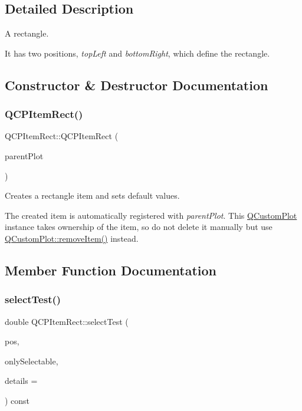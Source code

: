 \subsection{Detailed Description}
A rectangle. 

 It has two positions, {\itshape top\+Left} and {\itshape bottom\+Right}, which define the rectangle. 

\subsection{Constructor \& Destructor Documentation}
\mbox{\label{classQCPItemRect_a412ad1579f7a1fba453d0fa28c496cbc}} 
\subsubsection{\texorpdfstring{Q\+C\+P\+Item\+Rect()}{QCPItemRect()}}
{\footnotesize\ttfamily Q\+C\+P\+Item\+Rect\+::\+Q\+C\+P\+Item\+Rect (\begin{DoxyParamCaption}\item[{\hyperlink{classQCustomPlot}{Q\+Custom\+Plot} $\ast$}]{parent\+Plot }\end{DoxyParamCaption})\hspace{0.3cm}{\ttfamily [explicit]}}

Creates a rectangle item and sets default values.

The created item is automatically registered with {\itshape parent\+Plot}. This \hyperlink{classQCustomPlot}{Q\+Custom\+Plot} instance takes ownership of the item, so do not delete it manually but use \hyperlink{classQCustomPlot_ae04446557292551e8fb6e2c106e1848d}{Q\+Custom\+Plot\+::remove\+Item()} instead. 

\subsection{Member Function Documentation}
\mbox{\label{classQCPItemRect_a2e68621b75bae4da6ae0ab2cdd0dd733}} 
\subsubsection{\texorpdfstring{select\+Test()}{selectTest()}}
{\footnotesize\ttfamily double Q\+C\+P\+Item\+Rect\+::select\+Test (\begin{DoxyParamCaption}\item[{const Q\+PointF \&}]{pos,  }\item[{bool}]{only\+Selectable,  }\item[{Q\+Variant $\ast$}]{details = {} }\end{DoxyParamCaption}) const\hspace{0.3cm}{\ttfamily [virtual]}}

